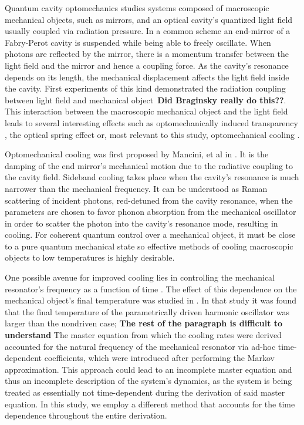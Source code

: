\documentclass[reprint, amsmath,amssymb, aps,pra]{revtex4-1}
\begin{document}
Quantum cavity optomechanics studies systems composed of macroscopic
mechanical objects, such as mirrors, and an optical cavity's quantized light field
usually coupled via radiation pressure.
In a common scheme an end-mirror of a Fabry-Perot
cavity is suspended while being able to freely oscillate.
When photons are reflected by the mirror, there is a
momentum transfer between the light field and the mirror and hence a coupling force. As the cavity's
resonance depends on its length, the mechanical
displacement affects the light field inside the cavity. First experiments of this kind demonstrated the radiation coupling between light field and mechanical object~\cite{BraginskiiOG}\textbf{Did Braginsky really do this??}. This interaction between
the macroscopic mechanical object and the light field leads to several
interesting effects such as optomechanically induced
transparency \cite{WeissOIT}, the optical spring effect \cite{VogelOT}
or, most relevant to this study, optomechanical
cooling \cite{CohadonCM, CorbittOC, SchliesserRPC, LCNooshi}.
	
Optomechanical cooling was first proposed by Mancini, et al in
\cite{ManciniOC}. It is the damping of the end mirror's mechanical
motion due to the radiative coupling to the cavity field. Sideband cooling takes place when the cavity's resonance is much narrower than the mechanical frequency. It can be understood as Raman scattering
\cite{MarquardtQTOQ} of incident photons, red-detuned from the
cavity resonance, when the parameters are chosen to favor phonon absorption from the mechanical oscillator in order to scatter the photon
into the cavity's resonance mode, resulting in cooling. For coherent quantum control over a mechanical object, it must be
close to a pure quantum mechanical state \cite{KippenberCO} so
effective methods of cooling macroscopic objects to low temperatures is highly desirable.

One possible avenue for improved cooling lies in controlling the
mechanical resonator's frequency as a function of time
\cite{JockelMR}. The effect of this dependence on the mechanical
object's final temperature was studied in \cite{BarberisLC}. In that
study it was found that the final temperature of the parametrically
driven harmonic oscillator was larger than the nondriven case;
\textbf{The rest of the paragraph is difficult to understand} The
master equation from which the cooling rates were derived accounted
for the natural frequency of the mechanical resonator via ad-hoc
time-dependent coefficients, which were introduced after performing
the Markov approximation. This approach could lead to an incomplete
master equation and thus an incomplete description of the system's
dynamics, as the system is being treated as essentially not
time-dependent during the derivation of said master equation. In this
study, we employ a different method that accounts for the time
dependence throughout the entire derivation.
\end{document}

